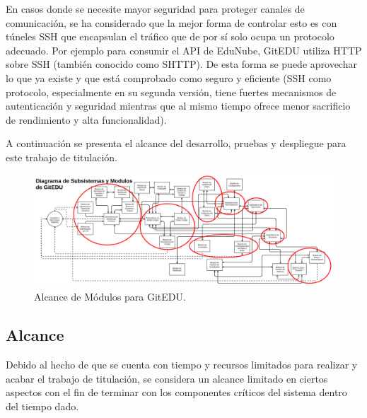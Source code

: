 En casos donde se necesite mayor seguridad para proteger canales de comunicación, se ha considerado que la mejor forma de controlar esto es con túneles SSH que encapsulan el tráfico que de por sí solo ocupa un protocolo adecuado. Por ejemplo para consumir el API de EduNube, GitEDU utiliza HTTP sobre SSH (también conocido como SHTTP). De esta forma se puede aprovechar lo que ya existe y que está comprobado como seguro y eficiente (SSH como protocolo, especialmente en su segunda versión, tiene fuertes mecanismos de autenticación y seguridad mientras que al mismo tiempo ofrece menor sacrificio de rendimiento y alta funcionalidad).

A continuación se presenta el alcance del desarrollo, pruebas y despliegue para este trabajo de titulación.

\pagebreak

\begin{landscape}

\begin{figure}
  \begin{center}
    \includegraphics[width=1.7\textwidth]{Figures/alc_mod_ge.png}
  \end{center}
  \caption{Alcance de Módulos para GitEDU.}
  \label{alc_mod_ge}
\end{figure}

\end{landscape}

\subsection{Alcance}

Debido al hecho de que se cuenta con tiempo y recursos limitados para realizar y acabar el trabajo de titulación, se considera un alcance limitado en ciertos aspectos con el fin de terminar con los componentes críticos del sistema dentro del tiempo dado.

